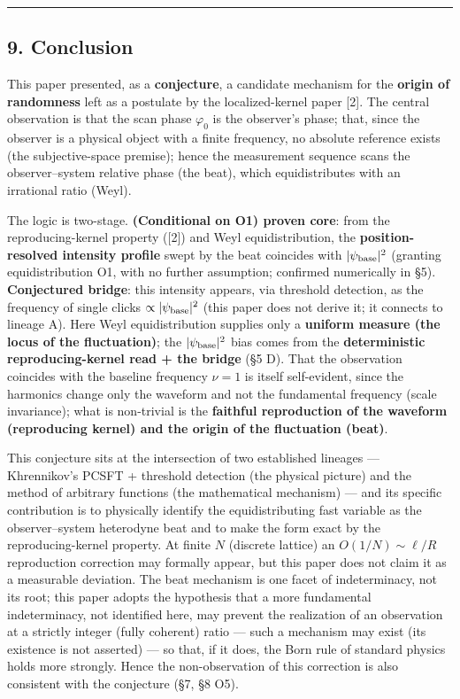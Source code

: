 \documentclass[
]{ltjsarticle}
\begin{document}
\begin{center}\rule{0.5\linewidth}{0.5pt}\end{center}

\subsection{9. Conclusion}\label{conclusion}

This paper presented, as a \textbf{conjecture}, a candidate mechanism
for the \textbf{origin of randomness} left as a postulate by the
localized-kernel paper {[}2{]}. The central observation is that the scan
phase \(\varphi_0\) is the observer's phase; that, since the observer is
a physical object with a finite frequency, no absolute reference exists
(the subjective-space premise); hence the measurement sequence scans the
observer--system relative phase (the beat), which equidistributes with
an irrational ratio (Weyl).

The logic is two-stage. \textbf{(Conditional on O1) proven core}: from
the reproducing-kernel property ({[}2{]}) and Weyl equidistribution, the
\textbf{position-resolved intensity profile} swept by the beat coincides
with \(|\psi_{\rm base}|^2\) (granting equidistribution O1, with no
further assumption; confirmed numerically in §5). \textbf{Conjectured
bridge}: this intensity appears, via threshold detection, as the
frequency of single clicks \(\propto|\psi_{\rm base}|^2\) (this paper
does not derive it; it connects to lineage A). Here Weyl
equidistribution supplies only a \textbf{uniform measure (the locus of
the fluctuation)}; the \(|\psi_{\rm base}|^2\) bias comes from the
\textbf{deterministic reproducing-kernel read + the bridge} (§5 D). That
the observation coincides with the baseline frequency \(\nu=1\) is
itself self-evident, since the harmonics change only the waveform and
not the fundamental frequency (scale invariance); what is non-trivial is
the \textbf{faithful reproduction of the waveform (reproducing kernel)
and the origin of the fluctuation (beat)}.

This conjecture sits at the intersection of two established lineages ---
Khrennikov's PCSFT + threshold detection (the physical picture) and the
method of arbitrary functions (the mathematical mechanism) --- and its
specific contribution is to physically identify the equidistributing
fast variable as the observer--system heterodyne beat and to make the
form exact by the reproducing-kernel property. At finite \(N\) (discrete
lattice) an \(O(1/N)\sim\ell/R\) reproduction correction may formally
appear, but this paper does not claim it as a measurable deviation. The
beat mechanism is one facet of indeterminacy, not its root; this paper
adopts the hypothesis that a more fundamental indeterminacy, not
identified here, may prevent the realization of an observation at a
strictly integer (fully coherent) ratio --- such a mechanism may exist
(its existence is not asserted) --- so that, if it does, the Born rule
of standard physics holds more strongly. Hence the non-observation of
this correction is also consistent with the conjecture (§7, §8 O5).
\end{document}
